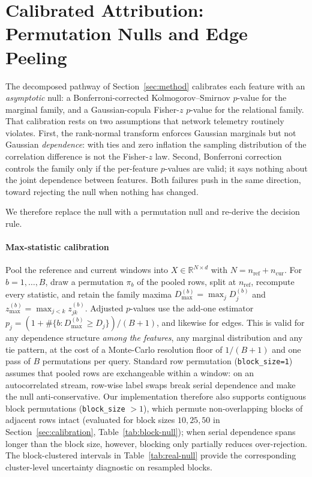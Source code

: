 
\section{Calibrated Attribution: Permutation Nulls and Edge Peeling}
\label{sec:calibrated}

The decomposed pathway of Section~\ref{sec:method} calibrates each feature with an
\emph{asymptotic} null: a Bonferroni-corrected Kolmogorov--Smirnov $p$-value for the
marginal family, and a Gaussian-copula Fisher-$z$ $p$-value for the relational family.
That calibration rests on two assumptions that network telemetry routinely violates.
First, the rank-normal transform enforces Gaussian marginals but not Gaussian
\emph{dependence}: with ties and zero inflation the sampling distribution of the
correlation difference is not the Fisher-$z$ law. Second, Bonferroni correction controls
the family only if the per-feature $p$-values are valid; it says nothing about the joint
dependence between features. Both failures push in the same direction, toward rejecting
the null when nothing has changed.

We therefore replace the null with a permutation null and re-derive the decision rule.

\paragraph{Max-statistic calibration}
Pool the reference and current windows into $X \in \mathbb{R}^{N \times d}$ with
$N = n_{\text{ref}} + n_{\text{cur}}$. For $b = 1, \dots, B$, draw a permutation $\pi_b$
of the pooled rows, split at $n_{\text{ref}}$, recompute every statistic, and retain the
family maxima $D^{(b)}_{\max} = \max_j D_j^{(b)}$ and
$z^{(b)}_{\max} = \max_{j < k} z^{(b)}_{jk}$. Adjusted $p$-values use the add-one
estimator $p_j = (1 + \#\{b : D^{(b)}_{\max} \ge D_j\}) / (B + 1)$, and likewise for
edges. This is valid for any dependence structure \emph{among the features}, any
marginal distribution and any tie pattern, at the cost of a Monte-Carlo resolution
floor of $1/(B+1)$ and one pass of $B$ permutations per query. Standard row permutation
(\texttt{block\_size=1}) assumes that pooled rows are exchangeable within a window: on an
autocorrelated stream, row-wise label swaps break serial dependence and make the null
anti-conservative. Our implementation therefore also supports contiguous block
permutations (\texttt{block\_size} $> 1$), which permute non-overlapping blocks of
adjacent rows intact (evaluated for block sizes $10, 25, 50$ in
Section~\ref{sec:calibration}, Table~\ref{tab:block-null}); when serial dependence spans
longer than the block size, however, blocking only partially reduces over-rejection. The
block-clustered intervals in Table~\ref{tab:real-null} provide the corresponding
cluster-level uncertainty diagnostic on resampled blocks.

